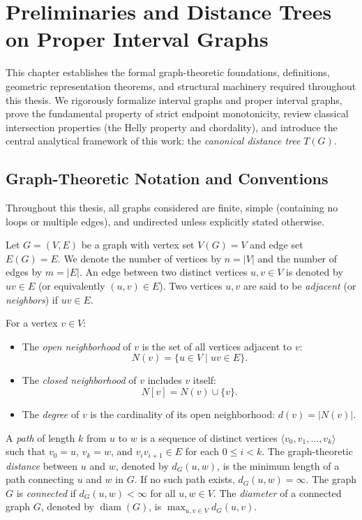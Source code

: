 \chapter{Preliminaries and Distance Trees on Proper Interval Graphs}
\label{chap:prelim}

This chapter establishes the formal graph-theoretic foundations, definitions, geometric representation theorems, and structural machinery required throughout this thesis. We rigorously formalize interval graphs and proper interval graphs, prove the fundamental property of strict endpoint monotonicity, review classical intersection properties (the Helly property and chordality), and introduce the central analytical framework of this work: the \emph{canonical distance tree} $T(G)$.

\section{Graph-Theoretic Notation and Conventions}
\label{sec:prelim_notation}

Throughout this thesis, all graphs considered are finite, simple (containing no loops or multiple edges), and undirected unless explicitly stated otherwise. 

Let $G = (V, E)$ be a graph with vertex set $V(G) = V$ and edge set $E(G) = E$. We denote the number of vertices by $n = |V|$ and the number of edges by $m = |E|$. An edge between two distinct vertices $u, v \in V$ is denoted by $uv \in E$ (or equivalently $(u, v) \in E$). Two vertices $u, v$ are said to be \emph{adjacent} (or \emph{neighbors}) if $uv \in E$.

For a vertex $v \in V$:
\begin{itemize}
    \item The \emph{open neighborhood} of $v$ is the set of all vertices adjacent to $v$:
    \begin{equation}
        N(v) = \{ u \in V \mid uv \in E \}.
    \end{equation}
    \item The \emph{closed neighborhood} of $v$ includes $v$ itself:
    \begin{equation}
        N[v] = N(v) \cup \{ v \}.
    \end{equation}
    \item The \emph{degree} of $v$ is the cardinality of its open neighborhood: $d(v) = |N(v)|$.
\end{itemize}

A \emph{path} of length $k$ from $u$ to $w$ is a sequence of distinct vertices $\langle v_0, v_1, \dots, v_k \rangle$ such that $v_0 = u$, $v_k = w$, and $v_i v_{i+1} \in E$ for each $0 \le i < k$. The graph-theoretic \emph{distance} between $u$ and $w$, denoted by $d_G(u, w)$, is the minimum length of a path connecting $u$ and $w$ in $G$. If no such path exists, $d_G(u, w) = \infty$. The graph $G$ is \emph{connected} if $d_G(u, w) < \infty$ for all $u, w \in V$. The \emph{diameter} of a connected graph $G$, denoted by $\operatorname{diam}(G)$, is $\max_{u, v \in V} d_G(u, v)$.

